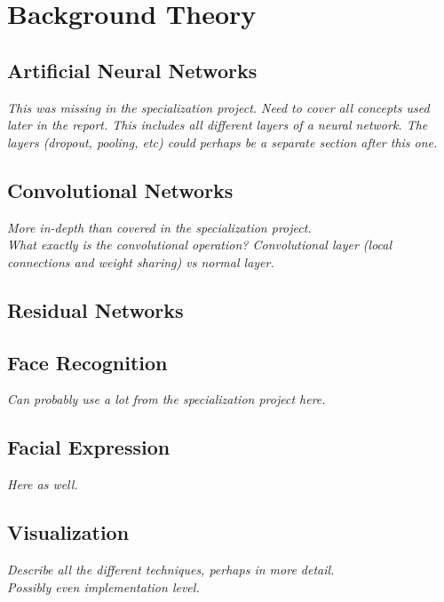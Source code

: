 
\chapter{Background Theory}

\section{Artificial Neural Networks}

\textit{This was missing in the specialization project. Need to cover all concepts used later in the report. This includes all different layers of a neural network. The layers (dropout, pooling, etc) could perhaps be a separate section after this one.}

\section{Convolutional Networks}

\textit{More in-depth than covered in the specialization project. \\
What exactly is the convolutional operation? Convolutional layer (local connections and weight sharing) vs normal layer.}

\section{Residual Networks}

\section{Face Recognition}

\textit{Can probably use a lot from the specialization project here.}

\section{Facial Expression}

\textit{Here as well.}

\section{Visualization}

\textit{Describe all the different techniques, perhaps in more detail. \\
Possibly even implementation level.}

\cleardoublepage